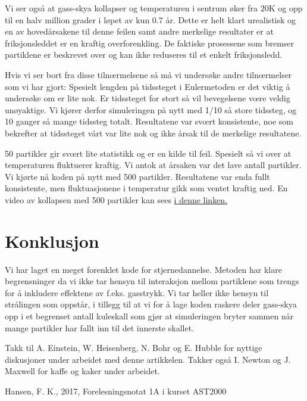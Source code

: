 \documentclass[reprint,english,notitlepage]{revtex4-1}  %
\begin{document}
Vi ser også at gass-skya kollapser og temperaturen i sentrum øker fra $20$K og opp til en halv million grader i løpet av kun 0.7 år. Dette er helt klart urealistisk og en av hovedårsakene til denne feilen samt andre merkelige resultater er at friksjonsleddet er en kraftig overforenkling. De faktiske prosessene som bremser partiklene er beskrevet over og kan ikke reduseres til et enkelt friksjonsledd.

Hvis vi ser bort fra disse tilnœrmelsene så må vi undersøke andre tilnœrmelser som vi har gjort: Spesielt lengden på tidssteget i Eulermetoden er det viktig å undersøke om er lite nok. Er tidssteget for stort så vil bevegelsene vœre veldig unøyaktige. Vi kjører derfor simuleringen på nytt med 1/10 så store tidssteg, og 10 ganger så mange tidssteg totalt. Resultatene var svœrt konsistente, noe som bekrefter at tidssteget vårt var lite nok og ikke årsak til de merkelige resultatene.

50 partikler gir svœrt lite statistikk og er en kilde til feil. Spesielt så vi over at temperaturen fluktuerer kraftig. Vi antok at årsaken var det lave antall partikler. Vi kjørte nå koden på nytt med 500 partikler. Resultatene var enda fullt konsistente, men fluktuasjonene i temperatur gikk som ventet kraftig ned. En video av kollapsen med 500 partikler kan sees \href{http://www.uio.no/studier/emner/matnat/astro/AST2000/h17/undervisningsmateriale-2017/filer-til-oppgaver/gas_cloud_collapse.gif}{i denne linken.}


\section{Konklusjon}

Vi har laget en meget forenklet kode for stjernedannelse. Metoden har klare begrensninger da vi ikke tar hensyn til interaksjon mellom partiklene som trengs for å inkludere effektene av f.eks. gasstrykk. Vi tar heller ikke hensyn til strålingen som oppstår, i tillegg til at vi for å lage koden raskere deler gass-skya opp i et begrenset antall kuleskall som gjør at simuleringen bryter sammen når mange partikler har fallt inn til det innerste skallet.



\begin{acknowledgments}
Takk til A. Einstein, W. Heisenberg, N. Bohr og E. Hubble for nyttige diskusjoner under arbeidet med denne artikkelen. Takker også I. Newton og J. Maxwell for kaffe og kaker under arbeidet.
\end{acknowledgments}




\begin{thebibliography}{}
 Hansen, F. K.,  2017, Forelesningsnotat 1A i kurset AST2000


\end{thebibliography}
\end{document}

